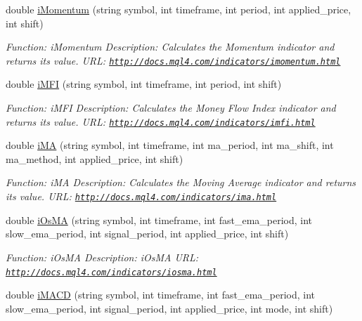 \begin{DoxyCompactItemize}
double \hyperlink{class_m_q_l4_c_sharp_1_1_base_1_1_m_q_l_base_af33b2ba1c09bb11c7745f45f85ca64fc}{i\+Momentum} (string symbol, int timeframe, int period, int applied\+\_\+price, int shift)
\begin{DoxyCompactList}\small\item\em Function\+: i\+Momentum Description\+: Calculates the Momentum indicator and returns its value. U\+RL\+: \href{http://docs.mql4.com/indicators/imomentum.html}{\tt http\+://docs.\+mql4.\+com/indicators/imomentum.\+html} \end{DoxyCompactList}\item 
double \hyperlink{class_m_q_l4_c_sharp_1_1_base_1_1_m_q_l_base_a58cb991b9c1d2a8d05edd044829ad8f1}{i\+M\+FI} (string symbol, int timeframe, int period, int shift)
\begin{DoxyCompactList}\small\item\em Function\+: i\+M\+FI Description\+: Calculates the Money Flow Index indicator and returns its value. U\+RL\+: \href{http://docs.mql4.com/indicators/imfi.html}{\tt http\+://docs.\+mql4.\+com/indicators/imfi.\+html} \end{DoxyCompactList}\item 
double \hyperlink{class_m_q_l4_c_sharp_1_1_base_1_1_m_q_l_base_a12ab24a5ade0876090204edbe37dcbe5}{i\+MA} (string symbol, int timeframe, int ma\+\_\+period, int ma\+\_\+shift, int ma\+\_\+method, int applied\+\_\+price, int shift)
\begin{DoxyCompactList}\small\item\em Function\+: i\+MA Description\+: Calculates the Moving Average indicator and returns its value. U\+RL\+: \href{http://docs.mql4.com/indicators/ima.html}{\tt http\+://docs.\+mql4.\+com/indicators/ima.\+html} \end{DoxyCompactList}\item 
double \hyperlink{class_m_q_l4_c_sharp_1_1_base_1_1_m_q_l_base_a72803c857a174c9c69fb81906b993f64}{i\+Os\+MA} (string symbol, int timeframe, int fast\+\_\+ema\+\_\+period, int slow\+\_\+ema\+\_\+period, int signal\+\_\+period, int applied\+\_\+price, int shift)
\begin{DoxyCompactList}\small\item\em Function\+: i\+Os\+MA Description\+: i\+Os\+MA U\+RL\+: \href{http://docs.mql4.com/indicators/iosma.html}{\tt http\+://docs.\+mql4.\+com/indicators/iosma.\+html} \end{DoxyCompactList}\item 
double \hyperlink{class_m_q_l4_c_sharp_1_1_base_1_1_m_q_l_base_a4addd1809b94671c64b254fc23404c35}{i\+M\+A\+CD} (string symbol, int timeframe, int fast\+\_\+ema\+\_\+period, int slow\+\_\+ema\+\_\+period, int signal\+\_\+period, int applied\+\_\+price, int mode, int shift)

\end{DoxyCompactItemize}
